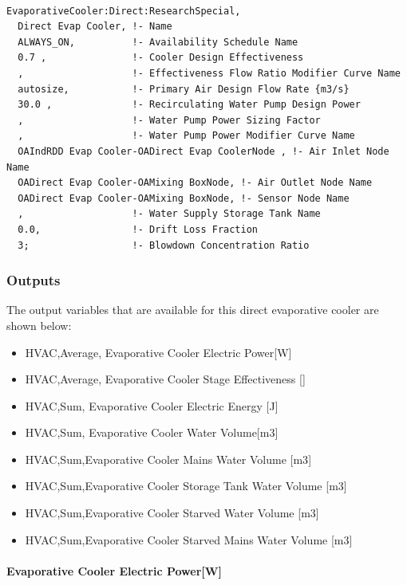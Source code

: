 \begin{lstlisting}

EvaporativeCooler:Direct:ResearchSpecial,
  Direct Evap Cooler, !- Name
  ALWAYS_ON,          !- Availability Schedule Name
  0.7 ,               !- Cooler Design Effectiveness
  ,                   !- Effectiveness Flow Ratio Modifier Curve Name
  autosize,           !- Primary Air Design Flow Rate {m3/s}
  30.0 ,              !- Recirculating Water Pump Design Power
  ,                   !- Water Pump Power Sizing Factor
  ,                   !- Water Pump Power Modifier Curve Name
  OAIndRDD Evap Cooler-OADirect Evap CoolerNode , !- Air Inlet Node Name
  OADirect Evap Cooler-OAMixing BoxNode, !- Air Outlet Node Name
  OADirect Evap Cooler-OAMixing BoxNode, !- Sensor Node Name
  ,                   !- Water Supply Storage Tank Name
  0.0,                !- Drift Loss Fraction
  3;                  !- Blowdown Concentration Ratio
\end{lstlisting}

\subsubsection{Outputs}\label{outputs-1-009}

The output variables that are available for this direct evaporative cooler are shown below:

\begin{itemize}
\item
  HVAC,Average, Evaporative Cooler Electric Power{[}W{]}
\item
  HVAC,Average, Evaporative Cooler Stage Effectiveness {[]}
\item
  HVAC,Sum, Evaporative Cooler Electric Energy {[}J{]}
\item
  HVAC,Sum, Evaporative Cooler Water Volume{[}m3{]}
\item
  HVAC,Sum,Evaporative Cooler Mains Water Volume {[}m3{]}
\item
  HVAC,Sum,Evaporative Cooler Storage Tank Water Volume {[}m3{]}
\item
  HVAC,Sum,Evaporative Cooler Starved Water Volume {[}m3{]}
\item
  HVAC,Sum,Evaporative Cooler Starved Mains Water Volume {[}m3{]}
\end{itemize}

\paragraph{Evaporative Cooler Electric Power{[}W{]}}\label{evaporative-cooler-electric-powerw-1}

